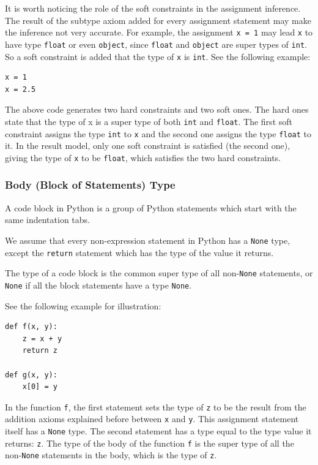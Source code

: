 It is worth noticing the role of the soft constraints in the assignment inference. The result of the subtype axiom added for every assignment statement may make the inference not very accurate. For example, the assignment \lstinline|x = 1| may lead \lstinline|x| to have type \lstinline|float| or even \lstinline|object|, since \lstinline|float| and \lstinline|object| are super types of \lstinline|int|. So a soft constraint is added that the type of \lstinline|x| is \lstinline|int|. See the following example:
\begin{lstlisting}
x = 1
x = 2.5
\end{lstlisting}

The above code generates two hard constraints and two soft ones. The hard ones state that the type of x is a super type of both \lstinline|int| and \lstinline|float|. The first soft constraint assigns the type \lstinline|int| to \lstinline|x| and the second one assigns the type \lstinline|float| to it. In the result model, only one soft constraint is satisfied (the second one), giving the type of \lstinline|x| to be \lstinline|float|, which satisfies the two hard constraints.

\subsubsection{Body (Block of Statements) Type}
A code block in Python is a group of Python statements which start with the same indentation tabs.

We assume that every non-expression statement in Python has a \lstinline|None| type, except the \lstinline|return| statement which has the type of the value it returns.

The type of a code block is the common super type of all non-\lstinline|None| statements, or \lstinline|None| if all the block statements have a type \lstinline|None|.

See the following example for illustration:
\begin{lstlisting}
def f(x, y):
	z = x + y
	return z
	
def g(x, y):
	x[0] = y
\end{lstlisting}

In the function \lstinline|f|, the first statement sets the type of \lstinline|z| to be the result from the addition axioms explained before between \lstinline|x| and \lstinline|y|. This assignment statement itself has a \lstinline|None| type. The second statement has a type equal to the type value it returns: \lstinline|z|.
The type of the body of the function \lstinline|f| is the super type of all the non-\lstinline|None| statements in the body, which is the type of \lstinline|z|.

